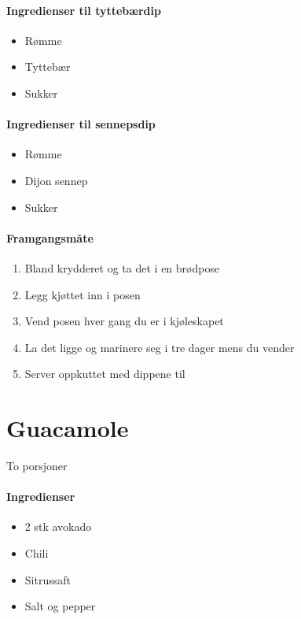 \documentclass[12pt,a4paper]{book}
\begin{document}
\paragraph{Ingredienser til tyttebærdip}
\begin{itemize}[noitemsep]
	\item Rømme
	\item Tyttebær
	\item Sukker
\end{itemize}

\paragraph{Ingredienser til sennepsdip}
\begin{itemize}[noitemsep]
	\item Rømme
	\item Dijon sennep
	\item Sukker
\end{itemize}

\paragraph{Framgangsmåte}
\begin{enumerate}[noitemsep]
	\item Bland krydderet og ta det i en brødpose
	\item Legg kjøttet inn i posen
	\item Vend posen hver gang du er i kjøleskapet
	\item La det ligge og marinere seg i tre dager mens du vender
	\item Server oppkuttet med dippene til
\end{enumerate}
\clearpage{}
\clearpage{}\section{﻿Guacamole}
\label{guacamole}
To porsjoner

\paragraph{Ingredienser}
\begin{itemize}[noitemsep]
	\item 2 stk avokado
	\item Chili
	\item Sitrussaft
	\item Salt og pepper
\end{itemize}
\end{document}
